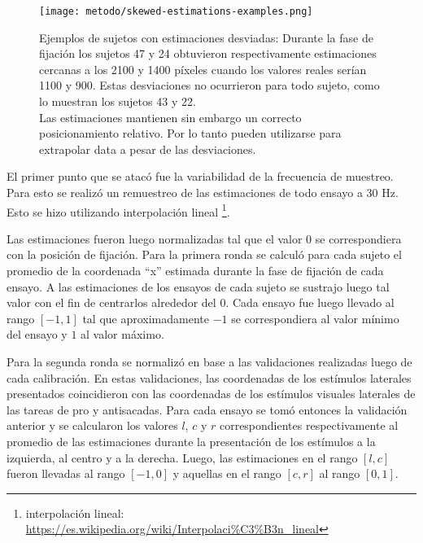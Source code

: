   \begin{figure}
    \centering

    \texttt{[image: metodo/skewed-estimations-examples.png]}

    

    \caption{Ejemplos de sujetos con estimaciones desviadas: Durante la fase de fijación los sujetos 47 y 24 obtuvieron respectivamente
    estimaciones cercanas a los 2100 y 1400 píxeles cuando los valores reales
    serían 1100 y 900.
    Estas desviaciones no ocurrieron para todo sujeto, como lo muestran los
    sujetos 43 y 22. \\
    Las estimaciones mantienen sin embargo un correcto posicionamiento
    relativo.
    Por lo tanto pueden utilizarse para extrapolar data a pesar de las
    desviaciones.}
    \label{fig:skewed-estimations-example}
  \end{figure}

  El primer punto que se atacó fue la variabilidad de la frecuencia de
  muestreo.
  Para esto se realizó un remuestreo de las estimaciones de todo ensayo a 30
  Hz.
  Esto se hizo utilizando interpolación lineal \footnote{
    interpolación lineal:
    \url{https://es.wikipedia.org/wiki/Interpolaci\%C3\%B3n\_lineal}
  }.

  Las estimaciones fueron luego normalizadas tal que el valor $0$ se
  correspondiera con la posición de fijación.
  Para la primera ronda se calculó para cada sujeto el promedio de la
  coordenada ``x'' estimada durante la fase de fijación de cada ensayo.
  A las estimaciones de los ensayos de cada sujeto se sustrajo luego tal valor
  con el fin de centrarlos alrededor del $0$.
  Cada ensayo fue luego llevado al rango $[-1, 1]$ tal que aproximadamente $-1$
  se correspondiera al valor mínimo del ensayo y $1$ al valor máximo.

  Para la segunda ronda se normalizó en base a las validaciones realizadas
  luego de cada calibración.
  En estas validaciones, las coordenadas de los estímulos laterales presentados
  coincidieron con las coordenadas de los estímulos visuales laterales de las
  tareas de pro y antisacadas.
  Para cada ensayo se tomó entonces la validación anterior y se calcularon los
  valores $l$, $c$ y $r$ correspondientes respectivamente al promedio de las
  estimaciones durante la presentación de los estímulos a la izquierda, al
  centro y a la derecha.
  Luego, las estimaciones en el rango $[l, c]$ fueron llevadas al rango $[-1,
  0]$ y aquellas en el rango $[c, r]$ al rango $[0, 1]$.

